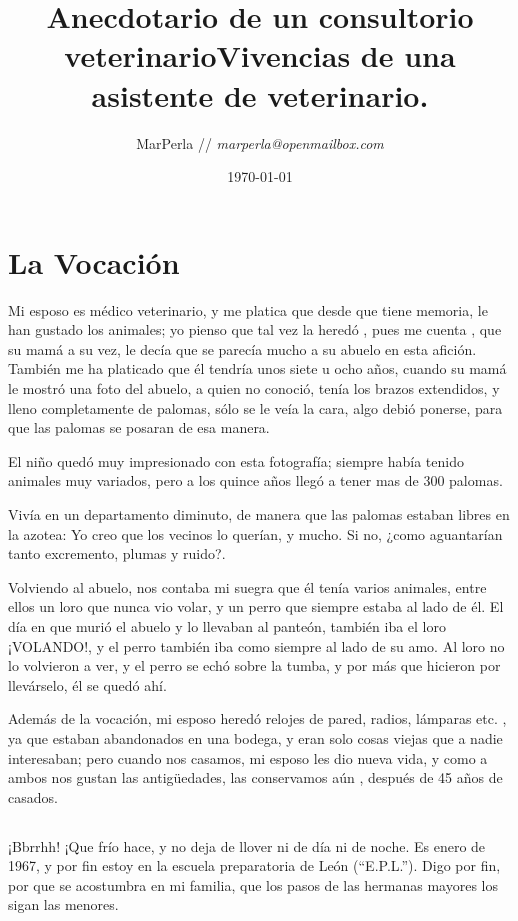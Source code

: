 \documentclass[letterpaper, 12pt]{book}
\title{{\sffamily  \huge Anecdotario de un consultorio veterinario}{\calligra Vivencias de una asistente de veterinario.}}
\author{  {\Large  MarPerla }// {\it marperla@openmailbox.com}}
\date{\today}
\begin{document}
\maketitle
\tableofcontents
\chapter{La Vocación}
Mi esposo es médico veterinario, y me platica que desde que tiene memoria, le han gustado los animales; yo pienso que tal vez la heredó , pues me cuenta , que su mamá a su vez, le decía que se parecía mucho a su abuelo en esta afición. También me ha platicado que él tendría unos siete u ocho años, cuando su mamá le mostró una foto del abuelo, a quien no conoció, tenía los brazos extendidos, y lleno completamente de palomas, sólo se le veía la cara, algo debió ponerse, para que las palomas se posaran de esa manera. 

El niño quedó muy impresionado con esta fotografía; siempre había tenido animales muy variados, pero a los quince años llegó a tener mas de 300 palomas. 

Vivía en un departamento diminuto, de manera que las palomas estaban libres en la azotea: Yo creo que los vecinos lo querían, y mucho. Si no, ¿como aguantarían tanto excremento, plumas y ruido?.

Volviendo al  abuelo, nos contaba mi suegra que él tenía varios animales, entre ellos un loro que nunca vio volar, y un perro que siempre estaba al lado de él. El día en que murió el abuelo y lo llevaban al panteón, también iba el loro ¡VOLANDO!, y el perro también iba como siempre al lado de su amo. Al loro no lo volvieron a ver, y el perro se echó sobre la tumba, y por más que hicieron por llevárselo, él se quedó ahí. 

Además de la vocación, mi esposo heredó relojes de pared, radios, lámparas etc. , ya que estaban abandonados en una bodega, y eran solo cosas viejas que a nadie interesaban; pero cuando nos casamos, mi esposo les dio nueva vida, y como a ambos nos gustan las antigüedades, las conservamos aún , después de 45 años de casados.
\section{}
¡Bbrrhh! ¡Que frío hace, y no deja de llover ni de día ni de noche. Es enero de 1967, y por fin estoy en la escuela preparatoria de León (``E.P.L.''). Digo por fin, por que se acostumbra en mi familia, que los pasos de las hermanas mayores los sigan las menores.
\end{document}
